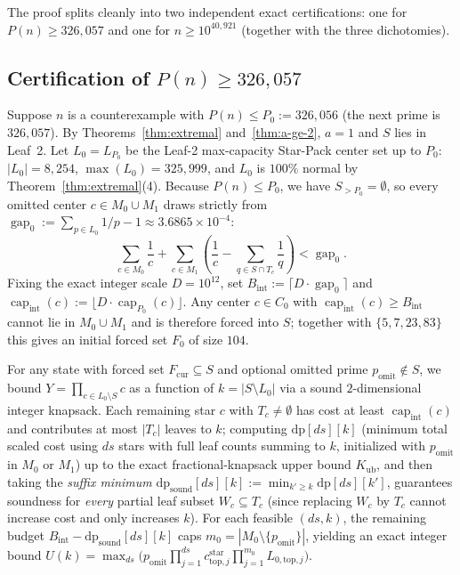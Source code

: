\documentclass[11pt]{article}
\theoremstyle{remark}
\newcommand{\capf}{\operatorname{cap}}
\newcommand{\gap}{\operatorname{gap}}
\begin{document}
The proof splits cleanly into two independent exact certifications: one for
$P(n) \ge 326{,}057$ and one for $n \ge 10^{40{,}921}$ (together with the three
dichotomies).

\subsection{Certification of \texorpdfstring{$P(n) \ge 326{,}057$}{P(n) >= 326,057}}\label{sec:proof-maxp}

Suppose $n$ is a counterexample with $P(n) \le P_0 := 326{,}056$ (the next prime
is $326{,}057$). By Theorems~\ref{thm:extremal} and~\ref{thm:a-ge-2}, $a = 1$
and $S$ lies in Leaf~2. Let $L_0 = L_{P_0}$ be the Leaf-2 max-capacity Star-Pack
center set up to $P_0$: $|L_0| = 8{,}254$, $\max(L_0) = 325{,}999$, and $L_0$ is
$100\%$ normal by Theorem~\ref{thm:extremal}(4). Because $P(n) \le P_0$, we have
$S_{>P_0} = \emptyset$, so every omitted center $c \in M_0 \cup M_1$ draws
strictly from $\gap_0 := \sum_{p\in L_0} 1/p - 1 \approx 3.6865 \times 10^{-4}$:
\begin{equation}\label{eq:p0-budget}
  \sum_{c \in M_0} \frac{1}{c}
  + \sum_{c \in M_1} \left(\frac{1}{c} - \sum_{q\in S\cap T_c}\frac{1}{q}\right)
  < \gap_0.
\end{equation}
Fixing the exact integer scale $D = 10^{12}$, set
$B_{\mathrm{int}} := \lceil D\cdot\gap_0\rceil$ and
$\capf_{\mathrm{int}}(c) := \lfloor D\cdot\capf_{P_0}(c)\rfloor$. Any center
$c \in C_0$ with $\capf_{\mathrm{int}}(c) \ge B_{\mathrm{int}}$ cannot lie in
$M_0 \cup M_1$ and is therefore forced into $S$; together with $\{5,7,23,83\}$
this gives an initial forced set $F_0$ of size $104$.

For any state with forced set $F_{\mathrm{cur}} \subseteq S$ and optional
omitted prime $p_{\mathrm{omit}} \notin S$, we bound $Y = \prod_{c\in L_0\setminus S} c$
as a function of $k = |S \setminus L_0|$ via a sound $2$-dimensional integer
knapsack. Each remaining star $c$ with $T_c \neq \emptyset$ has cost at least
$\capf_{\mathrm{int}}(c)$ and contributes at most $|T_c|$ leaves to $k$; computing
$\mathrm{dp}[ds][k]$ (minimum total scaled cost using $ds$ stars with full leaf
counts summing to $k$, initialized with $p_{\mathrm{omit}}$ in $M_0$ or $M_1$)
up to the exact fractional-knapsack upper bound $K_{\mathrm{ub}}$, and then
taking the \emph{suffix minimum} $\mathrm{dp}_{\mathrm{sound}}[ds][k] :=
\min_{k' \ge k} \mathrm{dp}[ds][k']$, guarantees soundness for \emph{every}
partial leaf subset $W_c \subseteq T_c$ (since replacing $W_c$ by $T_c$ cannot
increase cost and only increases $k$). For each feasible $(ds,k)$, the remaining
budget $B_{\mathrm{int}} - \mathrm{dp}_{\mathrm{sound}}[ds][k]$ caps
$m_0 = |M_0 \setminus \{p_{\mathrm{omit}}\}|$, yielding an exact integer bound
$U(k) = \max_{ds} \bigl(p_{\mathrm{omit}} \prod_{j=1}^{ds} c^{\mathrm{star}}_{\mathrm{top},j}
\prod_{j=1}^{m_0} L_{0,\mathrm{top},j}\bigr)$.
\end{document}

